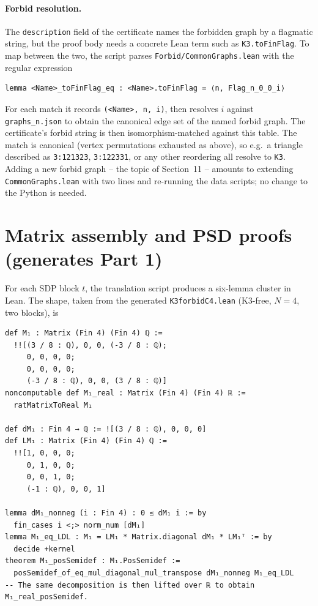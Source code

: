 \documentclass[11pt]{article}
\begin{document}
\paragraph{Forbid resolution.}
The \texttt{description} field of the certificate names the forbidden
graph by a flagmatic string, but the proof body needs a concrete Lean
term such as \texttt{K3.toFinFlag}. To map between the two, the script
parses \texttt{Forbid/CommonGraphs.lean} with the regular expression
\begin{lstlisting}[language={}]
lemma <Name>_toFinFlag_eq : <Name>.toFinFlag = ⟨n, Flag_n_0_0_i⟩
\end{lstlisting}
For each match it records \texttt{(<Name>, n, i)}, then resolves $i$
against \texttt{graphs\_n.json} to obtain the canonical edge set of the
named forbid graph. The certificate's forbid string is then
isomorphism-matched against this table. The match is canonical (vertex
permutations exhausted as above), so e.g.\ a triangle described as
\texttt{3:121323}, \texttt{3:122331}, or any other reordering all resolve
to \texttt{K3}. Adding a new forbid graph -- the topic of Section~11 --
amounts to extending \texttt{CommonGraphs.lean} with two lines and
re-running the data scripts; no change to the Python is needed.

\section{Matrix assembly and PSD proofs (generates Part 1)}
\label{sec:matrices}

For each SDP block $t$, the translation script produces a six-lemma cluster
in Lean. The shape, taken from the generated \texttt{K3forbidC4.lean}
(K3-free, $N=4$, two blocks), is

\begin{lstlisting}
def M₁ : Matrix (Fin 4) (Fin 4) ℚ :=
  !![(3 / 8 : ℚ), 0, 0, (-3 / 8 : ℚ);
     0, 0, 0, 0;
     0, 0, 0, 0;
     (-3 / 8 : ℚ), 0, 0, (3 / 8 : ℚ)]
noncomputable def M₁_real : Matrix (Fin 4) (Fin 4) ℝ :=
  ratMatrixToReal M₁

def dM₁ : Fin 4 → ℚ := ![(3 / 8 : ℚ), 0, 0, 0]
def LM₁ : Matrix (Fin 4) (Fin 4) ℚ :=
  !![1, 0, 0, 0;
     0, 1, 0, 0;
     0, 0, 1, 0;
     (-1 : ℚ), 0, 0, 1]

lemma dM₁_nonneg (i : Fin 4) : 0 ≤ dM₁ i := by
  fin_cases i <;> norm_num [dM₁]
lemma M₁_eq_LDL : M₁ = LM₁ * Matrix.diagonal dM₁ * LM₁ᵀ := by
  decide +kernel
theorem M₁_posSemidef : M₁.PosSemidef :=
  posSemidef_of_eq_mul_diagonal_mul_transpose dM₁_nonneg M₁_eq_LDL
-- The same decomposition is then lifted over ℝ to obtain M₁_real_posSemidef.
\end{lstlisting}
\end{document}
